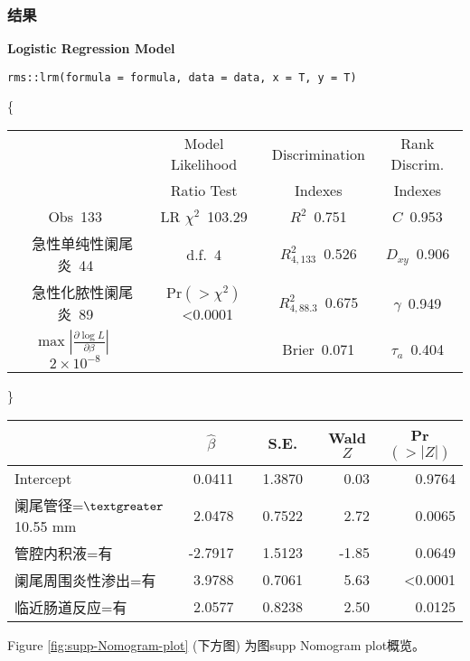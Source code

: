 \documentclass[
]{article}
\begin{document}
\hypertarget{ux7ed3ux679c-1}{%
\subsubsection{结果}\label{ux7ed3ux679c-1}}

\noindent \textbf{Logistic Regression Model}

\begin{verbatim}
rms::lrm(formula = formula, data = data, x = T, y = T)
\end{verbatim}

\{\selectfont 

\begin{center}\begin{tabular}{|c|c|c|c|}\hline
&Model Likelihood&Discrimination&Rank Discrim.\\
&Ratio Test&Indexes&Indexes\\\hline
Obs~\hfill 133&LR $\chi^{2}$~\hfill 103.29&$R^{2}$~\hfill 0.751&$C$~\hfill 0.953\\
~~急性单纯性阑尾炎~\hfill 44&d.f.~\hfill 4&$R^{2}_{4,133}$~\hfill 0.526&$D_{xy}$~\hfill 0.906\\
~~急性化脓性阑尾炎~\hfill 89&Pr$(>\chi^{2})$~\hfill \textless 0.0001&$R^{2}_{4,88.3}$~\hfill 0.675&$\gamma$~\hfill 0.949\\
$\max|\frac{\partial\log L}{\partial \beta}|$~\hfill $2\!\times\!10^{-8}$&&Brier~\hfill 0.071&$\tau_{a}$~\hfill 0.404\\
\hline
\end{tabular}
\end{center}

\}

\setlongtables

\begin{longtable}{lrrrr}\hline
\multicolumn{1}{l}{}&\multicolumn{1}{c}{$\hat{\beta}$}&\multicolumn{1}{c}{S.E.}&\multicolumn{1}{c}{Wald $Z$}&\multicolumn{1}{c}{Pr$(>|Z|)$}\tabularnewline
\hline
\endhead
\hline
\endfoot
Intercept&~ 0.0411~&~1.3870~& 0.03&0.9764\tabularnewline
阑尾管径=$\textgreater $ 10.55 mm&~ 2.0478~&~0.7522~& 2.72&0.0065\tabularnewline
管腔内积液=有&~-2.7917~&~1.5123~&-1.85&0.0649\tabularnewline
阑尾周围炎性渗出=有&~ 3.9788~&~0.7061~& 5.63&\textless 0.0001\tabularnewline
临近肠道反应=有&~ 2.0577~&~0.8238~& 2.50&0.0125\tabularnewline
\hline
\end{longtable}
\addtocounter{table}{-1}

Figure \ref{fig:supp-Nomogram-plot} (下方图) 为图supp Nomogram plot概览。
\end{document}
